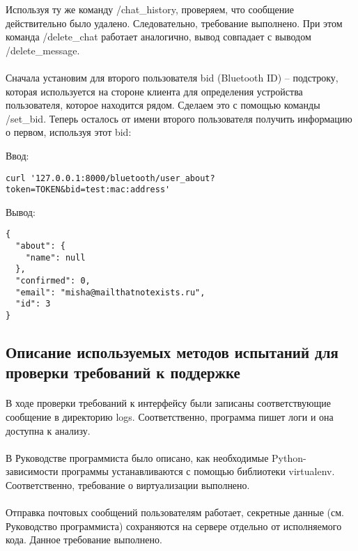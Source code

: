 \documentclass[testmethods]{espd}
\begin{document}
Используя ту же команду /chat\_history, проверяем, что сообщение действительно было удалено. Следовательно, требование выполнено. При этом команда /delete\_chat работает аналогично, вывод совпадает с выводом /delete\_message.

\paragraph{} %
Сначала установим для второго пользователя bid (Bluetooth ID) -- подстроку, которая используется на стороне клиента для определения устройства пользователя, которое находится рядом. Сделаем это с помощью команды /set\_bid. Теперь осталось от имени второго пользователя получить информацию о первом, используя этот bid:

Ввод:

\begin{verbatim}
curl '127.0.0.1:8000/bluetooth/user_about?token=TOKEN&bid=test:mac:address'
\end{verbatim}

Вывод:

\begin{verbatim}
{
  "about": {
    "name": null
  },
  "confirmed": 0,
  "email": "misha@mailthatnotexists.ru",
  "id": 3
}
\end{verbatim}

\subsection{Описание используемых методов испытаний для проверки требований к поддержке}
\paragraph{} %
В ходе проверки требований к интерфейсу были записаны соответствующие сообщение в директорию logs. Соответственно, программа пишет логи и она доступна к анализу.

\paragraph{} %
В Руководстве программиста было описано, как необходимые Python-зависимости программы устанавливаются с помощью библиотеки virtualenv. Соответственно, требование о виртуализации выполнено.

\paragraph{} %
Отправка почтовых сообщений пользователям работает, секретные данные (см. Руководство программиста) сохраняются на сервере отдельно от исполняемого кода. Данное требование выполнено.
\end{document}
